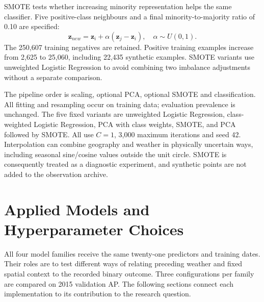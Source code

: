 \documentclass[conference,a4paper]{IEEEtran}
\begin{document}
SMOTE tests whether increasing minority representation helps the same classifier. Five positive-class neighbours and a final minority-to-majority ratio of 0.10 are specified:
\begin{equation}
\mathbf z_{new}=\mathbf z_i+\alpha(\mathbf z_j-\mathbf z_i),\quad \alpha\sim U(0,1).
\end{equation}
The 250,607 training negatives are retained. Positive training examples increase from 2,625 to 25,060, including 22,435 synthetic examples. SMOTE variants use unweighted Logistic Regression to avoid combining two imbalance adjustments without a separate comparison.

The pipeline order is scaling, optional PCA, optional SMOTE and classification. All fitting and resampling occur on training data; evaluation prevalence is unchanged. The five fixed variants are unweighted Logistic Regression, class-weighted Logistic Regression, PCA with class weights, SMOTE, and PCA followed by SMOTE. All use $C=1$, 3,000 maximum iterations and seed 42. Interpolation can combine geography and weather in physically uncertain ways, including seasonal sine/cosine values outside the unit circle. SMOTE is consequently treated as a diagnostic experiment, and synthetic points are not added to the observation archive.

\section{Applied Models and Hyperparameter Choices}
All four model families receive the same twenty-one predictors and training dates. Their roles are to test different ways of relating preceding weather and fixed spatial context to the recorded binary outcome. Three configurations per family are compared on 2015 validation AP. The following sections connect each implementation to its contribution to the research question.
\end{document}
